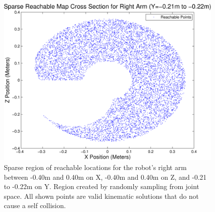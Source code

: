 \begin{figure}[thpb]
  \centering
\includegraphics[width=1.0\columnwidth]{./MATLAB/reachable2DofR4p8.pdf}
  \caption{Sparse region of reachable locations for the robot's right arm between -0.40m and 0.40m on X, -0.40m and 0.40m on Z, and -0.21 to -0.22m on Y.  Region created by randomly sampling from joint space.  All shown points are valid kinematic solutions that do not cause a self collision.}
  \label{fig:sparseRegion}
\end{figure}

